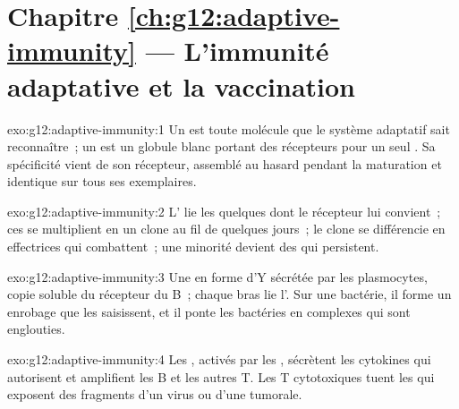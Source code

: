 \section*{Chapitre \ref{ch:g12:adaptive-immunity} --- L'immunité adaptative et la vaccination}

\begin{solution}{exo:g12:adaptive-immunity:1}
Un  est toute molécule que le système adaptatif sait
reconnaître~; un  est un globule blanc portant des
récepteurs pour un seul . Sa spécificité vient de son
récepteur, assemblé au hasard pendant la maturation et identique sur
tous ses exemplaires.
\end{solution}

\begin{solution}{exo:g12:adaptive-immunity:2}
L' lie les quelques  dont le récepteur lui
convient~; ces  se multiplient en un clone au fil de quelques
jours~; le clone se différencie en  effectrices qui
combattent~; une minorité devient des  qui persistent.
\end{solution}

\begin{solution}{exo:g12:adaptive-immunity:3}
Une  en forme d'Y sécrétée par les plasmocytes, copie soluble
du récepteur du  B~; chaque bras lie l'. Sur une
bactérie, il forme un enrobage que les  saisissent, et il
ponte les bactéries en complexes qui sont englouties.
\end{solution}

\begin{solution}{exo:g12:adaptive-immunity:4}
Les , activés par les ,
sécrètent les cytokines qui autorisent et amplifient les  B
et les autres  T. Les  T cytotoxiques tuent les
 qui exposent des fragments d'un virus ou d'une 
tumorale.
\end{solution}

